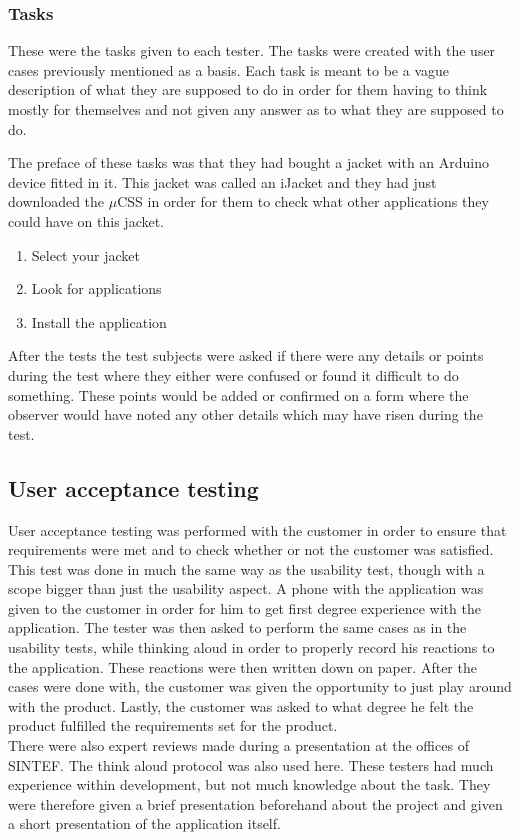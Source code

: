 		\subsubsection{Tasks}
			These were the tasks given to each tester. The tasks were created with the user cases previously mentioned as a basis. Each task is meant to be a vague description of what they are supposed to do in order for them having to think mostly for themselves and not given any answer as to what they are supposed to do.

			The preface of these tasks was that they had bought a jacket with an Arduino device fitted in it. This jacket was called an iJacket and they had just downloaded the $\mu$CSS in order for them to check what other applications they could have on this jacket.

			\vspace{6 mm}
			\begin{enumerate}
			 \item Select your jacket
			 \item Look for applications
			 \item Install the application
			\end{enumerate}
			\vspace{6 mm}

			After the tests the test subjects were asked if there were any details or points during the test where they either were confused or found it difficult to do something. These points would be added or confirmed on a form where the observer would have noted any other details which may have risen during the test.

		\subsection{User acceptance testing}
		User acceptance testing was performed with the customer in order to ensure that requirements were met and to check whether or not the customer was satisfied. This test was done in much the same way as the usability test, though with a scope bigger than just the usability aspect. A phone with the application was given to the customer in order for him to get first degree experience with the application. The tester was then asked to perform the same cases as in the usability tests, while thinking aloud in order to properly record his reactions to the application. These reactions were then written down on paper. After the cases were done with, the customer was given the opportunity to just play around with the product. Lastly, the customer was asked to what degree he felt the product fulfilled the requirements set for the product.\\
		\newline
		There were also expert reviews made during a presentation at the offices of SINTEF. The think aloud protocol was also used here. These testers had much experience within development, but not much knowledge about the task. They were therefore given a brief presentation beforehand about the project and given a short presentation of the application itself.\\

